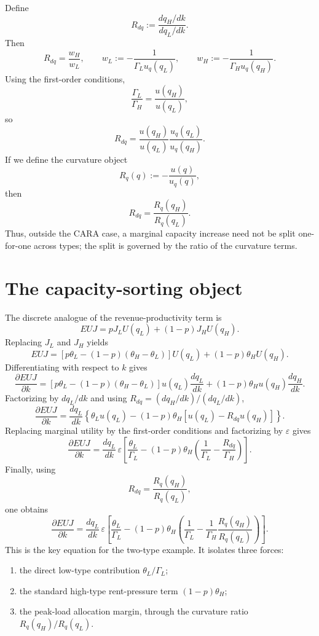 \documentclass[11pt]{article}
\begin{document}
Define
\[
R_{dq}:=\frac{dq_H/dk}{dq_L/dk}.
\]
Then
\[
R_{dq}=\frac{w_H}{w_L},
\qquad
w_L:=-\frac{1}{\Gamma_Lu_q(q_L)},
\qquad
w_H:=-\frac{1}{\Gamma_Hu_q(q_H)}.
\]
Using the first-order conditions,
\[
\frac{\Gamma_L}{\Gamma_H}=\frac{u(q_H)}{u(q_L)},
\]
so
\[
R_{dq}=\frac{u(q_H)}{u(q_L)}\frac{u_q(q_L)}{u_q(q_H)}.
\]
If we define the curvature object
\[
R_q(q):=-\frac{u(q)}{u_q(q)},
\]
then
\[
R_{dq}=\frac{R_q(q_H)}{R_q(q_L)}.
\]
Thus, outside the CARA case, a marginal capacity increase need not be split one-for-one across types; the split is governed by the ratio of the curvature terms.

\section{The capacity-sorting object}

The discrete analogue of the revenue-productivity term is
\[
EUJ=pJ_LU(q_L)+(1-p)J_HU(q_H).
\]
Replacing $J_L$ and $J_H$ yields
\[
EUJ
=
\left[p\theta_L-(1-p)\left(\theta_H-\theta_L\right)\right]U(q_L)
+
(1-p)\theta_HU(q_H).
\]
Differentiating with respect to $k$ gives
\[
\frac{\partial EUJ}{\partial k}
=
\left[p\theta_L-(1-p)\left(\theta_H-\theta_L\right)\right]u(q_L)\frac{dq_L}{dk}
+
(1-p)\theta_Hu(q_H)\frac{dq_H}{dk}.
\]
Factorizing by $dq_L/dk$ and using $R_{dq}=\left(dq_H/dk\right)/\left(dq_L/dk\right)$,
\[
\frac{\partial EUJ}{\partial k}
=
\frac{dq_L}{dk}
\left\{
\theta_Lu(q_L)
-
(1-p)\theta_H\left[u(q_L)-R_{dq}u(q_H)\right]
\right\}.
\]
Replacing marginal utility by the first-order conditions and factorizing by $\varepsilon$ gives
\[
\frac{\partial EUJ}{\partial k}
=
\frac{dq_L}{dk}\,\varepsilon
\left[
\frac{\theta_L}{\Gamma_L}
-
(1-p)\theta_H
\left(
\frac{1}{\Gamma_L}
-
\frac{R_{dq}}{\Gamma_H}
\right)
\right].
\]
Finally, using
\[
R_{dq}=\frac{R_q(q_H)}{R_q(q_L)},
\]
one obtains
\[
\frac{\partial EUJ}{\partial k}
=
\frac{dq_L}{dk}\,\varepsilon
\left[
\frac{\theta_L}{\Gamma_L}
-
(1-p)\theta_H
\left(
\frac{1}{\Gamma_L}
-
\frac{1}{\Gamma_H}\frac{R_q(q_H)}{R_q(q_L)}
\right)
\right].
\]
This is the key equation for the two-type example. It isolates three forces:
\begin{enumerate}
    \item the direct low-type contribution $\theta_L/\Gamma_L$;
    \item the standard high-type rent-pressure term $(1-p)\theta_H$;
    \item the peak-load allocation margin, through the curvature ratio $R_q(q_H)/R_q(q_L)$.
\end{enumerate}
\end{document}
